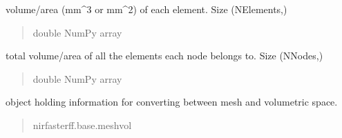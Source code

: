 \documentclass[letterpaper,10pt,english]{sphinxmanual}
\begin{document}
\begin{fulllineitems}
\begin{fulllineitems}
\begin{quote}
\begin{description}
\end{description}\end{quote}

\end{fulllineitems}


\begin{fulllineitems}
\label{\detokenize{_autosummary/nirfasterff.base.dcs_mesh.dcsmesh:nirfasterff.base.dcs_mesh.dcsmesh.element_area}}
\pysigstartsignatures
{}
\pysigstopsignatures
\sphinxAtStartPar
volume/area (mm\textasciicircum{}3 or mm\textasciicircum{}2) of each element. Size (NElements,)
\begin{quote}\begin{description}
\sphinxAtStartPar
double NumPy array

\end{description}\end{quote}

\end{fulllineitems}


\begin{fulllineitems}
\label{\detokenize{_autosummary/nirfasterff.base.dcs_mesh.dcsmesh:nirfasterff.base.dcs_mesh.dcsmesh.support}}
\pysigstartsignatures
{}
\pysigstopsignatures
\sphinxAtStartPar
total volume/area of all the elements each node belongs to. Size (NNodes,)
\begin{quote}\begin{description}
\sphinxAtStartPar
double NumPy array

\end{description}\end{quote}

\end{fulllineitems}


\begin{fulllineitems}
\label{\detokenize{_autosummary/nirfasterff.base.dcs_mesh.dcsmesh:nirfasterff.base.dcs_mesh.dcsmesh.vol}}
\pysigstartsignatures
{}
\pysigstopsignatures
\sphinxAtStartPar
object holding information for converting between mesh and volumetric space.
\begin{quote}\begin{description}
\sphinxAtStartPar
nirfasterff.base.meshvol


\end{description}
\end{quote}
\end{fulllineitems}
\end{fulllineitems}
\end{document}
